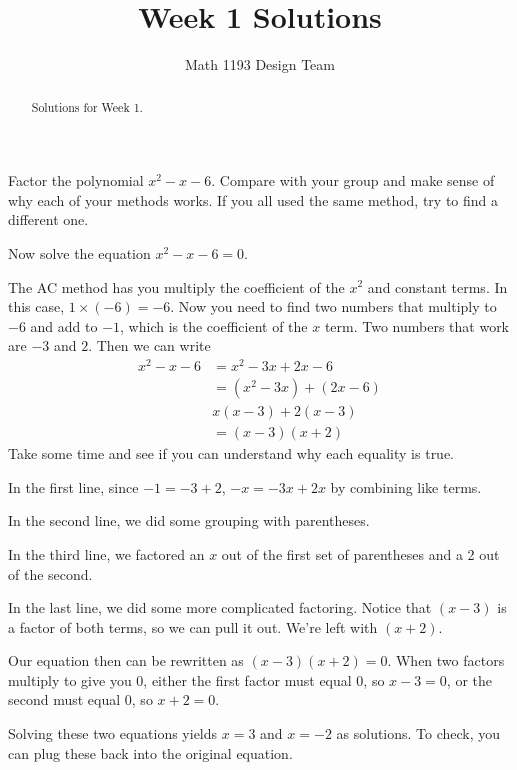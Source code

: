 \documentclass[noauthor]{ximera}
\title{Week 1 Solutions}
\author{Math 1193 Design Team}
\begin{document}
\begin{abstract}
    Solutions for Week 1.
\end{abstract}
\maketitle

\begin{problem}
    Factor the polynomial \(x^2 - x - 6\). Compare with 
your group and make sense of why each of your methods
works. If you all used the same method, try to find
a different one.

Now solve the equation \(x^2 - x - 6 = 0\).

\begin{explanation}
The AC method has you multiply the coefficient of the \(x^2\) and constant terms.
In this case, \(1 \times (-6) = -6\). Now you need to find two numbers that multiply
to \(-6\) and add to \(-1\), which is the coefficient of the \(x\) term.
Two numbers that work are \(-3\) and \(2\). Then we can write
\begin{align*}
x^2 - x - 6 & = x^2 -3x + 2x - 6 \\
& = (x^2 - 3x) + (2x - 6) \\
& x(x - 3) + 2(x - 3) \\
& = (x - 3)(x + 2)
\end{align*}
Take some time and see if you can understand why each equality is true.

In the first line, since \(-1 = -3 + 2\), \(-x = -3x + 2x\) by combining like terms.

In the second line, we did some grouping with parentheses.

In the third line, we factored an \(x\) out of the first set of parentheses and a 2 out of the second.

In the last line, we did some more complicated factoring. Notice that \((x - 3)\) is a factor of both terms, so 
we can pull it out. We're left with \((x + 2)\).

Our equation then can be rewritten as \((x - 3)(x + 2) = 0\). When two factors multiply to give you \(0\), 
either the first factor must equal \(0\), so \(x - 3 = 0\), or the second must equal \(0\), so \(x + 2 = 0\). 

Solving these two equations yields \(x = 3\) and \(x = -2\) as solutions. To check, you can plug these back into the original equation.
\end{explanation}
\end{problem}
\end{document}
